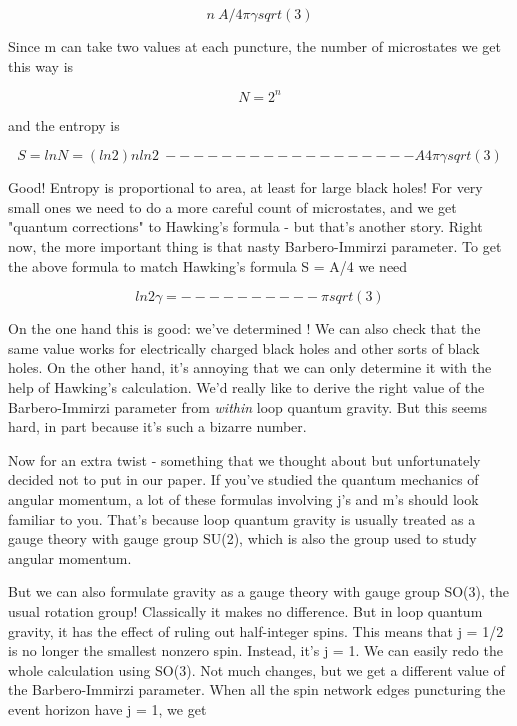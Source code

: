 $$
n ~ A / 4 \pi  \gamma  sqrt(3)
$$
    
Since m can take two values at each puncture, the number of microstates
we get this way is

$$
N = 2^{n}
$$
    
and the entropy is

$$
S = ln N

  = (ln 2) n


           ln 2 
  ~ ------------------ A
    4 \pi  \gamma  sqrt(3)  
$$
    
Good!  Entropy is proportional to area, at least for large black holes!
For very small ones we need to do a more careful count of microstates,
and we get "quantum corrections" to Hawking's formula - but that's
another story.  Right now, the more important thing is that nasty
Barbero-Immirzi parameter.  To get the above formula to match Hawking's
formula S = A/4 we need

$$
           ln 2
\gamma  = ----------
        \pi  sqrt(3)

$$
    
On the one hand this is good: we've determined \gamma !  We can also check
that the same value works for electrically charged black holes and
other sorts of black holes.  On the other hand, it's annoying that we
can only determine it with the help of Hawking's calculation.  We'd
really like to derive the right value of the Barbero-Immirzi parameter
from \emph{within} loop quantum gravity.  But this seems hard, in part
because it's such a bizarre number.

Now for an extra twist - something that we thought about but
unfortunately decided not to put in our paper.  If you've studied the
quantum mechanics of angular momentum, a lot of these formulas involving
j's and m's should look familiar to you.  That's because loop quantum
gravity is usually treated as a gauge theory with gauge group SU(2),
which is also the group used to study angular momentum.

But we can also formulate gravity as a gauge theory with gauge group
SO(3), the usual rotation group!  Classically it makes no difference.
But in loop quantum gravity, it has the effect of ruling out
half-integer spins.  This means that j = 1/2 is no longer the smallest
nonzero spin.  Instead, it's j = 1.  We can easily redo the whole
calculation using SO(3).  Not much changes, but we get a different value
of the Barbero-Immirzi parameter.  When all the spin network edges
puncturing the event horizon have j = 1, we get

